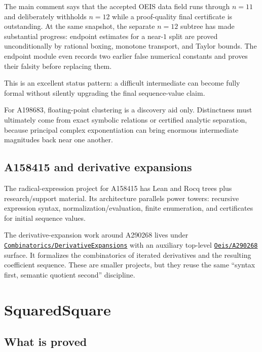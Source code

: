 \documentclass[
  10pt,
  a4paper,
  twoside,
  open=any,
  parskip=half,
  headings=big
]{scrreprt}
\newcommand{\CommitFull}{675d0a2ff0fc624fba199e006049016ba806f40a}
\newcommand{\RepoTreeBase}{https://github.com/VladimirReshetnikov/ProveIt/tree/\CommitFull/}
\newcommand{\RepoDir}[1]{%
  \href{\RepoTreeBase\detokenize{#1}}{\nolinkurl{#1}}}
\newcommand{\code}[1]{\texttt{\detokenize{#1}}}
\begin{document}
The main \code{A198683.lean} comment says that the accepted OEIS data field
runs through \(n=11\) and deliberately withholds \(n=12\) while a
proof-quality final certificate is outstanding.  At the same snapshot, the
separate \(n=12\) subtree has made substantial progress: endpoint estimates
for a near-\(1\) split are proved unconditionally by rational boxing,
monotone transport, and Taylor bounds.  The endpoint module even records two
earlier false numerical constants and proves their falsity before replacing
them.

This is an excellent status pattern: a difficult intermediate can become fully
formal without silently upgrading the final sequence-value claim.

\begin{boundarybox}
For A198683, floating-point clustering is a discovery aid only.  Distinctness
must ultimately come from exact symbolic relations or certified analytic
separation, because principal complex exponentiation can bring enormous
intermediate magnitudes back near one another.
\end{boundarybox}

\subsection{A158415 and derivative expansions}

The radical-expression project for A158415 has Lean and Rocq trees plus
research/support material.  Its architecture parallels power towers:
recursive expression syntax, normalization/evaluation, finite enumeration, and
certificates for initial sequence values.

The derivative-expansion work around A290268 lives under
\RepoDir{Combinatorics/DerivativeExpansions} with an auxiliary top-level
\RepoDir{Oeis/A290268} surface.  It formalizes the combinatorics of iterated
derivatives and the resulting coefficient sequence.  These are smaller
projects, but they reuse the same ``syntax first, semantic quotient second''
discipline.

\section{SquaredSquare}
\label{sec:squared-square}

\subsection{What is proved}
\end{document}
